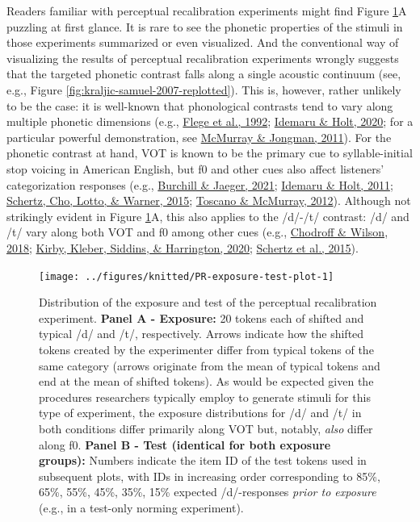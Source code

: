 \documentclass[
  11pt,
  english,
  man,floatsintext]{apa6}
\begin{document}
Readers familiar with perceptual recalibration experiments might find Figure \ref{fig:PR-exposure-test-plot}A puzzling at first glance. It is rare to see the phonetic properties of the stimuli in those experiments summarized or even visualized. And the conventional way of visualizing the results of perceptual recalibration experiments wrongly suggests that the targeted phonetic contrast falls along a single acoustic continuum (see, e.g., Figure \ref{fig:kraljic-samuel-2007-replotted}). This is, however, rather unlikely to be the case: it is well-known that phonological contrasts tend to vary along multiple phonetic dimensions (e.g., \protect\hyperlink{ref-flege1992}{Flege et al., 1992}; \protect\hyperlink{ref-idemaru-holt2020}{Idemaru \& Holt, 2020}; for a particular powerful demonstration, see \protect\hyperlink{ref-mcmurray-jongman2011}{McMurray \& Jongman, 2011}). For the phonetic contrast at hand, VOT is known to be the primary cue to syllable-initial stop voicing in American English, but f0 and other cues also affect listeners' categorization responses (e.g., \protect\hyperlink{ref-burchill-jaeger2022}{Burchill \& Jaeger, 2021}; \protect\hyperlink{ref-idemaru-holt2011}{Idemaru \& Holt, 2011}; \protect\hyperlink{ref-schertz2015}{Schertz, Cho, Lotto, \& Warner, 2015}; \protect\hyperlink{ref-toscano-mcmurray2012}{Toscano \& McMurray, 2012}).
Although not strikingly evident in Figure \ref{fig:PR-exposure-test-plot}A, this also applies to the /d/-/t/ contrast: /d/ and /t/ vary along both VOT and f0 among other cues (e.g., \protect\hyperlink{ref-chodroff-wilson2018}{Chodroff \& Wilson, 2018}; \protect\hyperlink{ref-kirby2020}{Kirby, Kleber, Siddins, \& Harrington, 2020}; \protect\hyperlink{ref-schertz2015}{Schertz et al., 2015}).\\



\begin{figure}

{\centering \texttt{[image: ../figures/knitted/PR-exposure-test-plot-1]} 

}

\caption{Distribution of the exposure and test of the perceptual recalibration experiment. \textbf{Panel A - Exposure:} 20 tokens each of shifted and typical /d/ and /t/, respectively. Arrows indicate how the shifted tokens created by the experimenter differ from typical tokens of the same category (arrows originate from the mean of typical tokens and end at the mean of shifted tokens). As would be expected given the procedures researchers typically employ to generate stimuli for this type of experiment, the exposure distributions for /d/ and /t/ in both conditions differ primarily along VOT but, notably, \emph{also} differ along f0. \textbf{Panel B - Test (identical for both exposure groups):} Numbers indicate the item ID of the test tokens used in subsequent plots, with IDs in increasing order corresponding to 85\%, 65\%, 55\%, 45\%, 35\%, 15\% expected /d/-responses \emph{prior to exposure} (e.g., in a test-only norming experiment).}\label{fig:PR-exposure-test-plot}
\end{figure}
\end{document}

